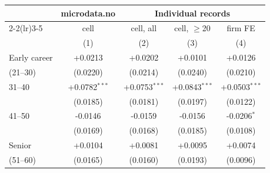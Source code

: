 \begin{tabular}{lcccc}
\toprule
 & microdata.no & \multicolumn{3}{c}{Individual records} \\
\cmidrule(lr){2-2}\cmidrule(lr){3-5}
 & cell & cell, all & cell, $\geq$20 & firm FE \\
 & (1) & (2) & (3) & (4) \\
\midrule
Early career & +0.0213 & +0.0202 & +0.0101 & +0.0126 \\
(21--30) & (0.0220) & (0.0214) & (0.0240) & (0.0210) \\
31--40 & +0.0782$^{***}$ & +0.0753$^{***}$ & +0.0843$^{***}$ & +0.0503$^{***}$ \\
 & (0.0185) & (0.0181) & (0.0197) & (0.0122) \\
41--50 & -0.0146 & -0.0159 & -0.0156 & -0.0206$^{*}$ \\
 & (0.0169) & (0.0168) & (0.0185) & (0.0108) \\
Senior & +0.0104 & +0.0081 & +0.0095 & +0.0074 \\
(51--60) & (0.0165) & (0.0160) & (0.0193) & (0.0096) \\
\bottomrule
\end{tabular}
